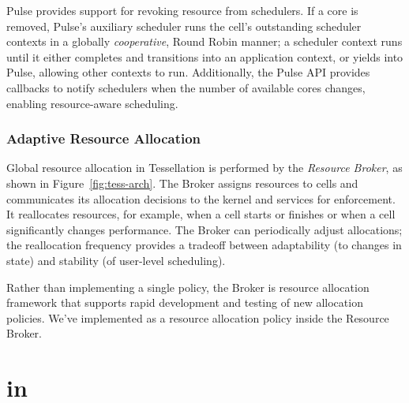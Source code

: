 Pulse provides support for revoking resource from schedulers. If a core is removed, Pulse's auxiliary scheduler runs the cell's outstanding scheduler contexts in
a globally \emph{cooperative}, Round Robin manner; \ie a scheduler context runs
until it either completes and transitions into an application context, or yields
into Pulse, allowing other contexts to run. Additionally, the Pulse API provides callbacks to notify schedulers when the number of available cores
changes, enabling resource-aware scheduling. 

\subsubsection{Adaptive Resource Allocation} \label{sec:rsc-alloc}

Global resource allocation in Tessellation is performed by the \emph{Resource Broker}, as
shown in Figure~\ref{fig:tess-arch}. The Broker assigns 
resources to cells and communicates its allocation decisions to the kernel
and services for enforcement.  It reallocates resources,
for example, when a cell starts or finishes or when a cell significantly
changes performance.  The Broker can periodically adjust allocations; the
reallocation frequency provides a tradeoff between adaptability (to
changes in state) and stability (of user-level scheduling).

Rather than implementing a single policy, the Broker is resource allocation framework that supports
rapid development and testing of new allocation policies. We've implemented \pacora as a resource allocation policy inside the Resource Broker.
 
\section{\pacora in \tess}

